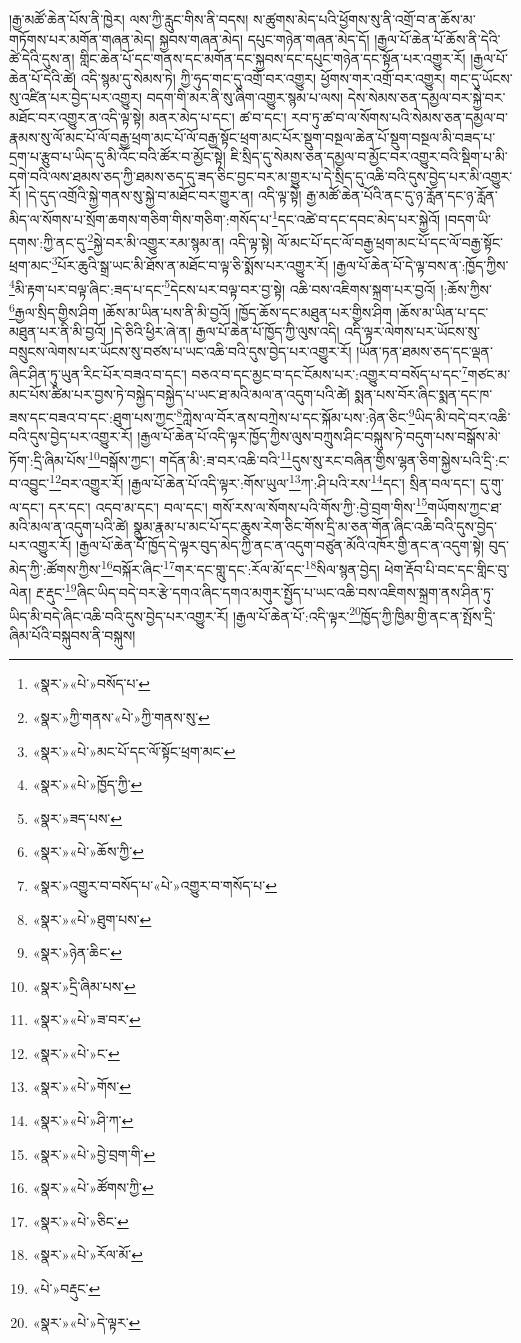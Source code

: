 །རྒྱ་མཚོ་ཆེན་པོས་ནི་ཁྱེར། ལས་ཀྱི་རླུང་གིས་ནི་བདས། ས་ཚུགས་མེད་པའི་ཕྱོགས་སུ་ནི་འགྲོ་བ་ན་ཆོས་མ་གཏོགས་པར་མགོན་གཞན་མེད། སྐྱབས་གཞན་མེད། དཔུང་གཉེན་གཞན་མེད་དོ། །རྒྱལ་པོ་ཆེན་པོ་ཆོས་ནི་དེའི་ཚེ་དེའི་དུས་ན། གླིང་ཆེན་པོ་དང་གནས་དང་མགོན་དང་སྐྱབས་དང་དཔུང་གཉེན་དང་སྟོན་པར་འགྱུར་རོ། །རྒྱལ་པོ་ཆེན་པོ་དེའི་ཚེ། འདི་སྙམ་དུ་སེམས་ཏེ། ཀྱི་ཧུད་གང་དུ་འགྲོ་བར་འགྱུར། ཕྱོགས་གར་འགྲོ་བར་འགྱུར། གང་དུ་ཡོངས་སུ་འཛིན་པར་བྱེད་པར་འགྱུར། བདག་གི་མར་ནི་སུ་ཞིག་འགྱུར་སྙམ་པ་ལས། དེས་སེམས་ཅན་དམྱལ་བར་སྐྱེ་བར་མཐོང་བར་འགྱུར་ན་འདི་ལྟ་སྟེ། མནར་མེད་པ་དང་། ཚ་བ་དང་། རབ་ཏུ་ཚ་བ་ལ་སོགས་པའི་སེམས་ཅན་དམྱལ་བ་རྣམས་སུ་ལོ་མང་པོ་ལོ་བརྒྱ་ཕྲག་མང་པོ་ལོ་བརྒྱ་སྟོང་ཕྲག་མང་པོར་སྡུག་བསྔལ་ཆེན་པོ་སྡུག་བསྔལ་མི་བཟད་པ་དྲག་པ་རྩུབ་པ་ཡིད་དུ་མི་འོང་བའི་ཚོར་བ་མྱོང་སྟེ། ཇི་སྲིད་དུ་སེམས་ཅན་དམྱལ་བ་མྱོང་བར་འགྱུར་བའི་སྡིག་པ་མི་དགེ་བའི་ལས་ཐམས་ཅད་ཀྱི་ཐམས་ཅད་དུ་ཟད་ཅིང་བྱང་བར་མ་གྱུར་པ་དེ་སྲིད་དུ་འཆི་བའི་དུས་བྱེད་པར་མི་འགྱུར་རོ། །དེ་དུད་འགྲོའི་སྐྱེ་གནས་སུ་སྐྱེ་བ་མཐོང་བར་གྱུར་ན། འདི་ལྟ་སྟེ། རྒྱ་མཚོ་ཆེན་པོའི་ནང་དུ་ཉ་རློན་དང་ཉ་རློན་མིད་ལ་སོགས་པ་སྲོག་ཆགས་གཅིག་གིས་གཅིག་:གསོད་པ་\footnote{«སྣར་»«པེ་»བསོད་པ་}དང་འཚེ་བ་དང་དབང་མེད་པར་སྐྱེའོ། །བདག་ཡི་དགས་:ཀྱི་ནང་དུ་\footnote{«སྣར་»ཀྱི་གནས་«པེ་»ཀྱི་གནས་སུ་}སྐྱེ་བར་མི་འགྱུར་རམ་སྙམ་ན། འདི་ལྟ་སྟེ། ལོ་མང་པོ་དང་ལོ་བརྒྱ་ཕྲག་མང་པོ་དང་ལོ་བརྒྱ་སྟོང་ཕྲག་མང་\footnote{«སྣར་»«པེ་»མང་པོ་དང་ལོ་སྟོང་ཕྲག་མང་}པོར་ཆུའི་སྒྲ་ཡང་མི་ཐོས་ན་མཐོང་བ་ལྟ་ཅི་སྨོས་པར་འགྱུར་རོ། །རྒྱལ་པོ་ཆེན་པོ་དེ་ལྟ་བས་ན་:ཁྱོད་ཀྱིས་\footnote{«སྣར་»«པེ་»ཁྱོད་ཀྱི་}མི་རྟག་པར་བལྟ་ཞིང་:ཟད་པ་དང་\footnote{«སྣར་»ཟད་པས་}དེངས་པར་བལྟ་བར་བྱ་སྟེ། འཆི་བས་འཇིགས་སྐྲག་པར་བྱའོ། །:ཆོས་ཀྱིས་\footnote{«སྣར་»«པེ་»ཆོས་ཀྱི་}རྒྱལ་སྲིད་གྱིས་ཤིག །ཆོས་མ་ཡིན་པས་ནི་མི་བྱའོ། །ཁྱོད་ཆོས་དང་མཐུན་པར་གྱིས་ཤིག །ཆོས་མ་ཡིན་པ་དང་མཐུན་པར་ནི་མི་བྱའོ། །དེ་ཅིའི་ཕྱིར་ཞེ་ན། རྒྱལ་པོ་ཆེན་པོ་ཁྱོད་ཀྱི་ལུས་འདི། འདི་ལྟར་ལེགས་པར་ཡོངས་སུ་བསྲུངས་ལེགས་པར་ཡོངས་སུ་བཙས་པ་ཡང་འཆི་བའི་དུས་བྱེད་པར་འགྱུར་རོ། །ཡོན་ཏན་ཐམས་ཅད་དང་ལྡན་ཞིང་ཤིན་ཏུ་ཡུན་རིང་པོར་བཟའ་བ་དང་། བཅའ་བ་དང་མྱང་བ་དང་ངོམས་པར་:འགྱུར་བ་བསོད་པ་དང་\footnote{«སྣར་»འགྱུར་བ་བསོད་པ་«པེ་»འགྱུར་བ་གསོད་པ་}གཙང་མ་མང་པོས་ཚིམ་པར་བྱས་ཏེ་བསྐྱེད་བསྐྱེད་པ་ཡང་ཐ་མའི་མལ་ན་འདུག་པའི་ཚེ། སྨན་པས་བོར་ཞིང་སྨན་དང་ཁ་ཟས་དང་བཟའ་བ་དང་:ཐུག་པས་ཀྱང་\footnote{«སྣར་»«པེ་»ཐུག་པས་}ཀླེས་ལ་བོར་ནས་བཀྲེས་པ་དང་སྐོམ་པས་:ཉེན་ཅིང་\footnote{«སྣར་»ཉེན་ཆིང་}ཡིད་མི་བདེ་བར་འཆི་བའི་དུས་བྱེད་པར་འགྱུར་རོ། །རྒྱལ་པོ་ཆེན་པོ་འདི་ལྟར་ཁྱོད་ཀྱིས་ལུས་བཀྲུས་ཤིང་བསྐུས་ཏེ་བདུག་པས་བསྒོས་མེ་ཏོག་:དྲི་ཞིམ་པོས་\footnote{«སྣར་»དྲི་ཞིམ་པས་}བསྒོས་ཀྱང་། གདོན་མི་:ཟ་བར་འཆི་བའི་\footnote{«སྣར་»«པེ་»ཟ་བར་}དུས་སུ་རང་བཞིན་གྱིས་ལྷན་ཅིག་སྐྱེས་པའི་དྲི་:ང་བ་འབྱུང་\footnote{«སྣར་»«པེ་»ང་}བར་འགྱུར་རོ། །རྒྱལ་པོ་ཆེན་པོ་འདི་ལྟར་:གོས་ཡུལ་\footnote{«སྣར་»«པེ་»གོས་}ཀ་:ཤི་པའི་རས་\footnote{«སྣར་»«པེ་»ཤི་ཀ་}དང་། སྲིན་བལ་དང་། དུ་གུ་ལ་དང་། དར་དང་། འདབ་མ་དང་། བལ་དང་། གསོ་རས་ལ་སོགས་པའི་གོས་ཀྱི་:བྱེ་བྲག་གིས་\footnote{«སྣར་»«པེ་»བྱེ་བྲག་གི་}གཡོགས་ཀྱང་ཐ་མའི་མལ་ན་འདུག་པའི་ཚེ། སྣུམ་རྣམ་པ་མང་པོ་དང་ཆུས་རེག་ཅིང་གོས་དྲི་མ་ཅན་གོན་ཞིང་འཆི་བའི་དུས་བྱེད་པར་འགྱུར་རོ། །རྒྱལ་པོ་ཆེན་པོ་ཁྱོད་དེ་ལྟར་བུད་མེད་ཀྱི་ནང་ན་འདུག་བཙུན་མོའི་འཁོར་གྱི་ནང་ན་འདུག་སྟེ། བུད་མེད་ཀྱི་:ཚོགས་ཀྱིས་\footnote{«སྣར་»«པེ་»ཚོགས་ཀྱི་}བསྐོར་ཞིང་\footnote{«སྣར་»«པེ་»ཅིང་}གར་དང་གླུ་དང་:རོལ་མོ་དང་\footnote{«སྣར་»«པེ་»རོལ་མོ་}སིལ་སྙན་བྱེད། ཕེག་རྡོབ་པི་བང་དང་གླིང་བུ་ལེན། རྔ་རྡུང་\footnote{«པེ་»བརྡུང་}ཞིང་ཡིད་བདེ་བར་རྩེ་དགའ་ཞིང་དགའ་མགུར་སྤྱོད་པ་ཡང་འཆི་བས་འཇིགས་སྐྲག་ནས་ཤིན་ཏུ་ཡིད་མི་བདེ་ཞིང་འཆི་བའི་དུས་བྱེད་པར་འགྱུར་རོ། །རྒྱལ་པོ་ཆེན་པོ་:འདི་ལྟར་\footnote{«སྣར་»«པེ་»དེ་ལྟར་}ཁྱོད་ཀྱི་ཁྱིམ་གྱི་ནང་ན་སྤོས་དྲི་ཞིམ་པོའི་བསྐུབས་ནི་བསྐུས། 